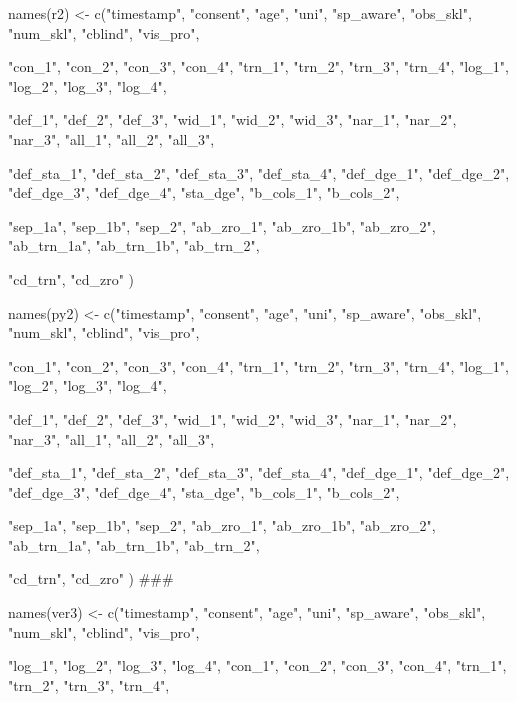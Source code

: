 \documentclass{article}
\begin{document}
names(r2) <- c("timestamp", "consent", "age", "uni", "sp_aware", "obs_skl", "num_skl", "cblind", "vis_pro",
                 
                 "con_1", "con_2", "con_3", "con_4", 
                 "trn_1", "trn_2", "trn_3", "trn_4",
                 "log_1", "log_2", "log_3", "log_4",
                 
                 "def_1", "def_2", "def_3", 
                 "wid_1", "wid_2", "wid_3",
                 "nar_1", "nar_2", "nar_3", 
                 "all_1", "all_2", "all_3",
                 
                 "def_sta_1", "def_sta_2", "def_sta_3", "def_sta_4", 
                 "def_dge_1", "def_dge_2", "def_dge_3", "def_dge_4",
                 "sta_dge",
                 "b_cols_1", "b_cols_2", 
  
                 "sep_1a", "sep_1b", "sep_2",
                 "ab_zro_1", "ab_zro_1b", "ab_zro_2",
                 "ab_trn_1a", "ab_trn_1b", "ab_trn_2", 
  
                 "cd_trn",
                 "cd_zro"
                 )

names(py2) <- c("timestamp", "consent", "age", "uni", "sp_aware", "obs_skl", "num_skl", "cblind", "vis_pro",
                 
                 "con_1", "con_2", "con_3", "con_4", 
                 "trn_1", "trn_2", "trn_3", "trn_4",
                 "log_1", "log_2", "log_3", "log_4",
                 
                 "def_1", "def_2", "def_3", 
                 "wid_1", "wid_2", "wid_3",
                 "nar_1", "nar_2", "nar_3", 
                 "all_1", "all_2", "all_3",
                 
                 "def_sta_1", "def_sta_2", "def_sta_3", "def_sta_4", 
                 "def_dge_1", "def_dge_2", "def_dge_3", "def_dge_4",
                 "sta_dge",
                 "b_cols_1", "b_cols_2", 
  
                 "sep_1a", "sep_1b", "sep_2",
                 "ab_zro_1", "ab_zro_1b", "ab_zro_2",
                 "ab_trn_1a", "ab_trn_1b", "ab_trn_2", 
  
                 "cd_trn",
                 "cd_zro"
                 )
###

names(ver3) <- c("timestamp", "consent", "age", "uni", "sp_aware", "obs_skl", "num_skl", "cblind", "vis_pro",
                 
                 "log_1", "log_2", "log_3", "log_4",
                 "con_1", "con_2", "con_3", "con_4", 
                 "trn_1", "trn_2", "trn_3", "trn_4",
                 
\end{document}
